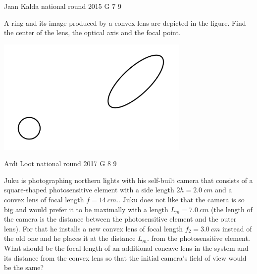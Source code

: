 \documentclass[11pt]{article}
\begin{document}
{Jaan Kalda} %
{national round} %
{2015} %
{G 7} %
{9} %
{

\ifEngStatement
A ring and its image produced by a convex lens are depicted in the figure. Find the center of the lens, the optical axis and the focal point.
\begin{center}
\includegraphics[width=0.7\textwidth]{2015-v3g-07-ringjaellips}%
\end{center}
\fi
}

{Ardi Loot} %
{national round} %
{2017} %
{G 8} %
{9} %
{

\ifEngStatement
Juku is photographing northern lights with his self-built camera that consists of a square-shaped photosensitive element with a side length $2h=\SI{2.0}{cm}$ and a convex lens of focal length $f=\SI{14}{cm}.$. Juku does not like that the camera is so big and would prefer it to be maximally with a length $L_{m}=\SI{7.0}{cm}$ (the length of the camera is the distance between the photosensitive element and the outer lens). For that he installs a new convex lens of focal length $f_{2}=\SI{3.0}{cm}$ instead of the old one and he places it at the distance $L_{m}.$ from the photosensitive element. What should be the focal length of an additional concave lens in the system and its distance from the convex lens so that the initial camera’s field of view would be the same?
\fi
}
\end{document}
